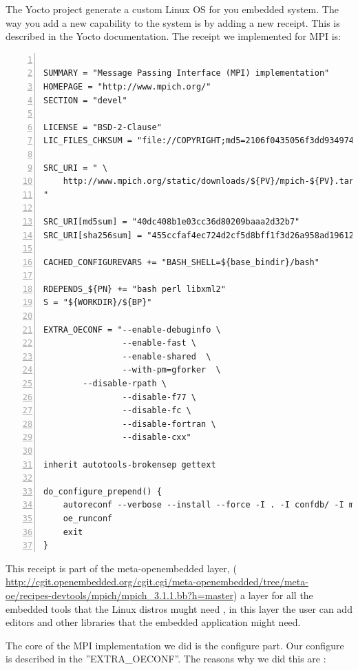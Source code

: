 The Yocto project \cite{yocto-project} generate a custom Linux OS for you
embedded system. The way you add a new capability to the system is by adding a
new receipt. This is described in the Yocto documentation. The receipt we
implemented for MPI is: 

\begin{lstlisting}[frame=single,numbers=left,breaklines=true,basicstyle=\tiny]

SUMMARY = "Message Passing Interface (MPI) implementation"
HOMEPAGE = "http://www.mpich.org/"
SECTION = "devel"

LICENSE = "BSD-2-Clause"
LIC_FILES_CHKSUM = "file://COPYRIGHT;md5=2106f0435056f3dd9349747a766e5816"

SRC_URI = " \
	http://www.mpich.org/static/downloads/${PV}/mpich-${PV}.tar.gz \
"

SRC_URI[md5sum] = "40dc408b1e03cc36d80209baaa2d32b7"
SRC_URI[sha256sum] = "455ccfaf4ec724d2cf5d8bff1f3d26a958ad196121e7ea26504fd3018757652d"

CACHED_CONFIGUREVARS += "BASH_SHELL=${base_bindir}/bash"

RDEPENDS_${PN} += "bash perl libxml2"
S = "${WORKDIR}/${BP}"

EXTRA_OECONF = "--enable-debuginfo \
                --enable-fast \
                --enable-shared  \
                --with-pm=gforker  \
		--disable-rpath \
                --disable-f77 \
                --disable-fc \
                --disable-fortran \
                --disable-cxx"

inherit autotools-brokensep gettext

do_configure_prepend() {
    autoreconf --verbose --install --force -I . -I confdb/ -I maint/
    oe_runconf
    exit
}

\end{lstlisting}

This receipt is part of the meta-openembedded layer, (
\url{http://cgit.openembedded.org/cgit.cgi/meta-openembedded/tree/meta-oe/recipes-devtools/mpich/mpich_3.1.1.bb?h=master})
a layer for all the embedded tools that the Linux distros mught need , in this
layer the user can add editors and other libraries that the embedded
application might need. 

The core of the MPI implementation we did is the configure part. Our configure
is described in the ''EXTRA\_OECONF''. The reasons why we did this are : 

